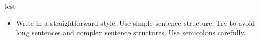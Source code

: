 \documentclass{sigchi-ext}
\begin{document}
test






\begin{itemize}\compresslist%
\item Write in a straightforward style. Use simple sentence
  structure. Try to avoid long sentences and complex sentence
  structures. Use semicolons carefully.

\end{itemize}


\end{document}
